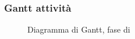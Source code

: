 \subsubsection{Gantt attività}
\begin{figure}[H]
\centering
{}
\caption{Diagramma di Gantt, fase di \AR{}}
\end{figure}

